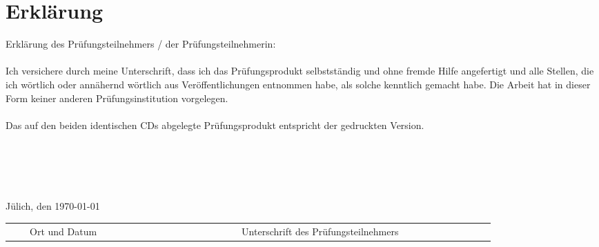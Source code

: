 \chapter{Erklärung}
Erklärung des Prüfungsteilnehmers / der Prüfungsteilnehmerin:
\\
\\
Ich versichere durch meine Unterschrift, dass ich das Prüfungsprodukt selbstständig und ohne fremde Hilfe angefertigt und alle Stellen, die ich wörtlich oder annähernd wörtlich aus Veröffentlichungen entnommen habe, als solche kenntlich gemacht habe. Die Arbeit hat in dieser Form keiner anderen Prüfungsinstitution vorgelegen.
\\
\\
Das auf den beiden identischen CDs abgelegte Prüfungsprodukt entspricht der gedruckten Version.
\\
\\
\\
\\
\\
\\\small{Jülich, den \today}\\
\begin{tabular}{r r r r r r r r r r r r r r r r r r r r r r r r r r r}
\cline{1-5} \cline{12-25}\\[-0.3cm]
& &\tiny{Ort und Datum}& & & & & & & & & & & & & & &\tiny{Unterschrift des Prüfungsteilnehmers}& & & & & & &\\
\end{tabular}
\cleardoublepage